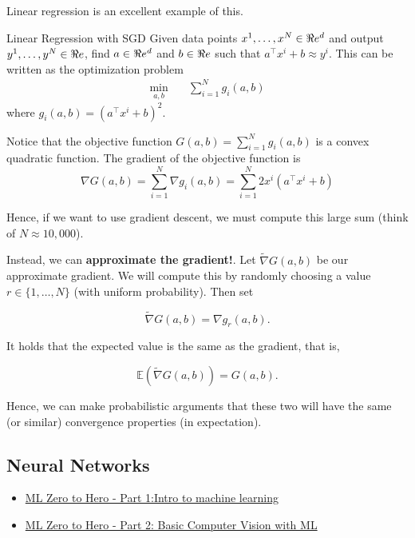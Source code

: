  
 
 Linear regression is an excellent example of this.  

\begin{example}{Linear Regression with SGD}{}
Given data points $x^1, \dots, x^N \in \Re e^d$ and output $y^1, \dots, y^N \in \Re e$, find $a \in \Re e^d$ and $b \in \Re e$ such that $a^\top x^i + b \approx y^i$.   This can be written as the optimization problem 
\begin{align*}
\min_{a,b} \quad & \sum_{i=1}^N g_i(a,b)
\end{align*}
where $g_i(a,b) = (a^\top x^i + b)^2$.   

Notice that the objective function $G(a,b) = \sum_{i=1}^N g_i(a,b)$  is a convex quadratic function.  The gradient of the objective function is 
$$
\nabla G(a,b) = \sum_{i=1}^N \nabla g_i(a,b) = \sum_{i=1}^N 2x^i (a^\top x^i + b)
$$

Hence, if we want to use gradient descent, we must compute this large sum (think of $N \approx 10,000$).  

Instead, we can \textbf{approximate the gradient!}.  Let $\tilde \nabla G(a,b)$ be our approximate gradient.  We will compute this by randomly choosing a value $r \in \{1, \dots, N\}$ (with uniform probability).  Then set

$$
\tilde \nabla G(a,b) = \nabla g_r(a,b).
$$

It holds that the expected value is the same as the gradient, that is,

$$
\mathbb{E}(\tilde \nabla G(a,b)) = G(a,b).
$$


Hence, we can make probabilistic arguments that these two will have the same (or similar) convergence properties (in expectation).
\end{example}

\subsection{Neural Networks}

\begin{resource}
\begin{itemize}
\item \href{https://www.youtube.com/watch?v=KNAWp2S3w94&feature=emb_logo&ab_channel=TensorFlow}{ML Zero to Hero - Part 1:Intro to machine learning}
\item \href{https://www.youtube.com/watch?v=bemDFpNooA8&ab_channel=TensorFlow}{ML Zero to Hero - Part 2: Basic Computer Vision with ML}
\end{itemize}
\end{resource}




